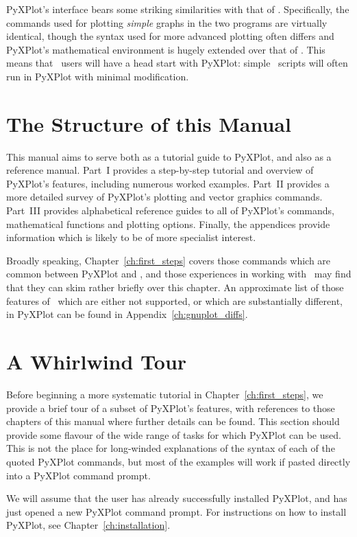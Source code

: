 PyXPlot's interface bears some striking similarities with that of \gnuplot.
Specifically, the commands used for plotting {\it simple} graphs in the two
programs are virtually identical, though the syntax used for more advanced
plotting often differs and PyXPlot's mathematical environment is hugely
extended over that of \gnuplot. This means that \gnuplot\ users will have a
head start with PyXPlot: simple \gnuplot\ scripts will often run in PyXPlot
with minimal modification.

\section{The Structure of this Manual}

This manual aims to serve both as a tutorial guide to PyXPlot, and also as a
reference manual. Part~I provides a step-by-step tutorial and overview of
PyXPlot's features, including numerous worked examples. Part~II provides a more
detailed survey of PyXPlot's plotting and vector graphics commands. Part~III
provides alphabetical reference guides to all of PyXPlot's commands,
mathematical functions and plotting options.  Finally, the appendices provide
information which is likely to be of more specialist interest.

Broadly speaking, Chapter~\ref{ch:first_steps} covers those commands which are
common between PyXPlot and \gnuplot, and those experiences in working with
\gnuplot\ may find that they can skim rather briefly over this chapter. An
approximate list of those features of \gnuplot\ which are either not supported,
or which are substantially different, in PyXPlot can be found in
Appendix~\ref{ch:gnuplot_diffs}.

\section{A Whirlwind Tour}

Before beginning a more systematic tutorial in Chapter~\ref{ch:first_steps}, we
provide a brief tour of a subset of PyXPlot's features, with references to
those chapters of this manual where further details can be found. This section
should provide some flavour of the wide range of tasks for which PyXPlot can be
used. This is not the place for long-winded explanations of the syntax of each
of the quoted PyXPlot commands, but most of the examples will work if pasted
directly into a PyXPlot command prompt.

We will assume that the user has already successfully installed PyXPlot, and
has just opened a new PyXPlot command prompt. For instructions on how to
install PyXPlot, see Chapter~\ref{ch:installation}.

